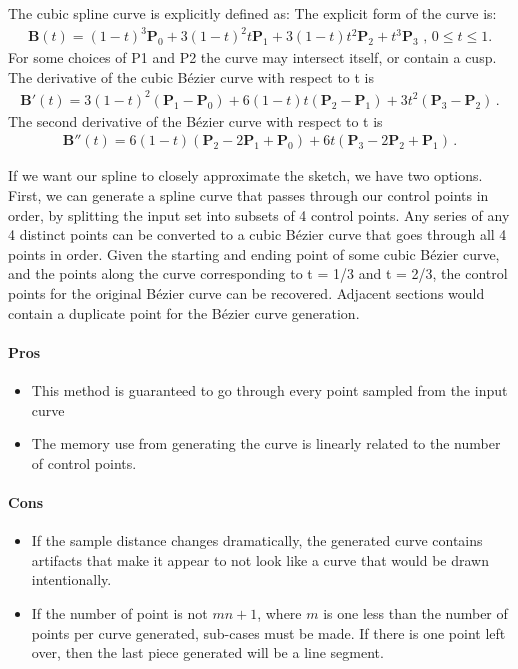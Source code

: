 \documentclass[12pt]{report}
\begin{document}
The cubic spline curve is explicitly defined as:
The explicit form of the curve is:
\begin{align}
\mathbf{B}(t)=(1-t)^3\mathbf{P}_0+3(1-t)^2t\mathbf{P}_1+3(1-t)t^2\mathbf{P}_2+t^3\mathbf{P}_3 \mbox{ , } 0 \le t \le 1.
\end{align}
For some choices of P1 and P2 the curve may intersect itself, or contain a cusp.
The derivative of the cubic Bézier curve with respect to t is
\begin{align}
\mathbf{B}'(t) = 3(1-t)^2(\mathbf{P}_1 - \mathbf{P}_0) + 6(1-t)t(\mathbf{P}_2 - \mathbf{P}_1) + 3t^2(\mathbf{P}_3 - \mathbf{P}_2) \,.
\end{align}
The second derivative of the Bézier curve with respect to t is
\begin{align}
\mathbf{B}''(t) = 6(1-t)(\mathbf{P}_2 - 2 \mathbf{P}_1 + \mathbf{P}_0) +  6t(\mathbf{P}_3 - 2 \mathbf{P}_2 + \mathbf{P}_1) \,.
\end{align}

If we want our spline to closely approximate the sketch, we have two options. 
First, we can generate a spline curve that passes through our control points in order, by splitting the input set into subsets of 4 control points.
Any series of any 4 distinct points can be converted to a cubic Bézier curve that goes through all 4 points in order.
Given the starting and ending point of some cubic Bézier curve, and the points along the curve corresponding to t = 1/3 and t = 2/3, the control points for the original Bézier curve can be recovered.
Adjacent sections would contain a duplicate point for the Bézier curve generation.

\paragraph{Pros}

\begin{itemize}
\item This method is guaranteed to go through every point sampled from the input curve
\item The memory use from generating the curve is linearly related to the number of control points.
\end{itemize}

\paragraph{Cons}
\begin{itemize}
\item If the sample distance changes dramatically, the generated curve contains artifacts that make it appear to not look like a curve that would be drawn intentionally.
\item If the number of point is not $mn + 1$, where $m$ is one less than the number of points per curve generated, sub-cases must be made. If there is one point left over, then the last piece generated will be a line segment.
\end{itemize}
\end{document}
